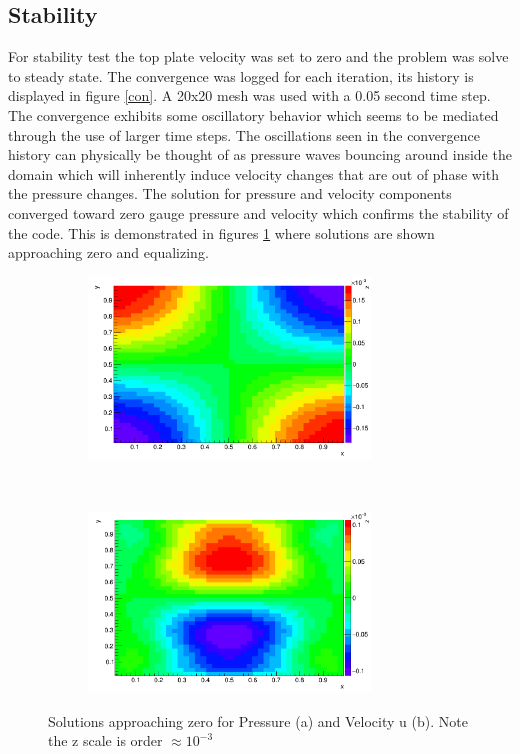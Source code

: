 \documentclass[paper=a4, fontsize=11pt, abstract=on]{scrartcl}
\numberwithin{equation}{section}		%
\numberwithin{figure}{section}			%
\numberwithin{table}{section}				%
\begin{document}
\subsection{Stability}
For stability test the top plate velocity was set to zero and the problem was solve to steady state. The convergence was logged for each iteration, its history is displayed in figure \ref{con}. A 20x20 mesh was used with a 0.05 second time step. The convergence exhibits some oscillatory behavior which seems to be mediated through the use of larger time steps. The oscillations seen in the convergence history can physically be thought of as pressure waves bouncing around inside the domain which will inherently induce velocity changes that are out of phase with the pressure changes. The solution for pressure and velocity components converged toward zero gauge pressure and velocity which confirms the stability of the code. This is demonstrated in figures \ref{zero1} where solutions are shown approaching zero and equalizing. 




\begin{figure}[H]
        \centering
        \begin{subfigure}[h]{0.5\textwidth}
                \includegraphics[width = 7.5cm]{z1}
                \caption{}
				
        \end{subfigure}%
       ~~~~~
        \begin{subfigure}[h]{0.5\textwidth}
                \includegraphics[width = 7.5cm]{z2}
                \caption{}
                
        \end{subfigure}
        \caption{Solutions approaching zero for Pressure (a) and Velocity u (b). Note the z scale is order $\approx 10^{-3}$ }
        \label{zero1}
\end{figure}
\end{document}
